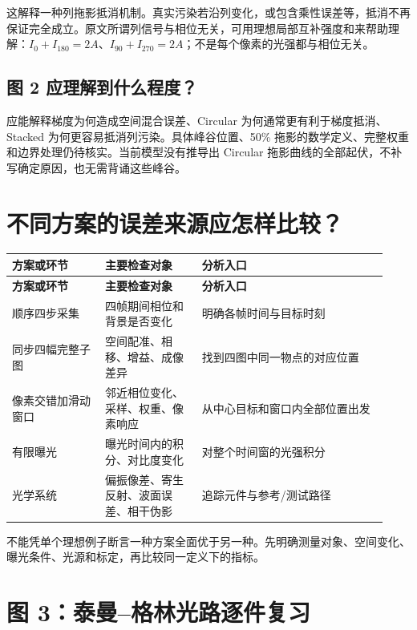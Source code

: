 \documentclass[UTF8,fontset=fandol,11pt,a4paper]{ctexart}
\begin{document}
这解释一种列拖影抵消机制。真实污染若沿列变化，或包含乘性误差等，抵消不再保证完全成立。原文所谓列信号与相位无关，可用理想局部互补强度和来帮助理解：\(I_0+I_{180}=2A\)、\(I_{90}+I_{270}=2A\)；不是每个像素的光强都与相位无关。

\subsection{图 2 应理解到什么程度？}

应能解释梯度为何造成空间混合误差、Circular 为何通常更有利于梯度抵消、Stacked 为何更容易抵消列污染。具体峰谷位置、50\% 拖影的数学定义、完整权重和边界处理仍待核实。当前模型没有推导出 Circular 拖影曲线的全部起伏，不补写确定原因，也无需背诵这些峰谷。

\section{不同方案的误差来源应怎样比较？}

{\small
\begin{longtable}{>{\raggedright\arraybackslash}p{0.23\linewidth}>{\raggedright\arraybackslash}p{0.24\linewidth}>{\raggedright\arraybackslash}p{0.46\linewidth}}
\toprule
\textbf{方案或环节} & \textbf{主要检查对象} & \textbf{分析入口} \\
\midrule
\endfirsthead
\toprule
\textbf{方案或环节} & \textbf{主要检查对象} & \textbf{分析入口} \\
\midrule
\endhead
顺序四步采集 & 四帧期间相位和背景是否变化 & 明确各帧时间与目标时刻 \\
同步四幅完整子图 & 空间配准、相移、增益、成像差异 & 找到四图中同一物点的对应位置 \\
像素交错加滑动窗口 & 邻近相位变化、采样、权重、像素响应 & 从中心目标和窗口内全部位置出发 \\
有限曝光 & 曝光时间内的积分、对比度变化 & 对整个时间窗的光强积分 \\
光学系统 & 偏振像差、寄生反射、波面误差、相干伪影 & 追踪元件与参考/测试路径 \\
\bottomrule
\end{longtable}
}

不能凭单个理想例子断言一种方案全面优于另一种。先明确测量对象、空间变化、曝光条件、光源和标定，再比较同一定义下的指标。

\section{图 3：泰曼–格林光路逐件复习}
\end{document}

